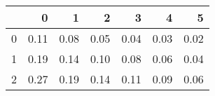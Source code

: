 \begin{tabular}{lrrrrrr}
\toprule
{} &     0 &     1 &     2 &     3 &     4 &     5 \\
\midrule
0 &  0.11 &  0.08 &  0.05 &  0.04 &  0.03 &  0.02 \\
1 &  0.19 &  0.14 &  0.10 &  0.08 &  0.06 &  0.04 \\
2 &  0.27 &  0.19 &  0.14 &  0.11 &  0.09 &  0.06 \\
\bottomrule
\end{tabular}
